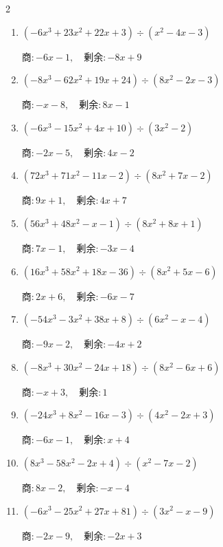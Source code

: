 \begin{multicols}{2}
\begin{enumerate}
        $商 : -9x-1, \quad 剰余 : 2x+4$

  \item $(-6x^{3}+23x^{2}+22x+3) \div (x^{2}-4x-3)$

        $商 : -6x-1, \quad 剰余 : -8x+9$

  \item $(-8x^{3}-62x^{2}+19x+24) \div (8x^{2}-2x-3)$

        $商 : -x-8, \quad 剰余 : 8x-1$

\columnbreak %

\resetques

  \item $(-6x^{3}-15x^{2}+4x+10) \div (3x^{2}-2)$

        $商 : -2x-5, \quad 剰余 : 4x-2$

  \item $(72x^{3}+71x^{2}-11x-2) \div (8x^{2}+7x-2)$

        $商 : 9x+1, \quad 剰余 : 4x+7$

  \item $(56x^{3}+48x^{2}-x-1) \div (8x^{2}+8x+1)$

        $商 : 7x-1, \quad 剰余 : -3x-4$

  \item $(16x^{3}+58x^{2}+18x-36) \div (8x^{2}+5x-6)$

        $商 : 2x+6, \quad 剰余 : -6x-7$

  \item $(-54x^{3}-3x^{2}+38x+8) \div (6x^{2}-x-4)$

        $商 : -9x-2, \quad 剰余 : -4x+2$

\columnbreak %

  \item $(-8x^{3}+30x^{2}-24x+18) \div (8x^{2}-6x+6)$

        $商 : -x+3, \quad 剰余 : 1$

  \item $(-24x^{3}+8x^{2}-16x-3) \div (4x^{2}-2x+3)$

        $商 : -6x-1, \quad 剰余 : x+4$

  \item $(8x^{3}-58x^{2}-2x+4) \div (x^{2}-7x-2)$

        $商 : 8x-2, \quad 剰余 : -x-4$

  \item $(-6x^{3}-25x^{2}+27x+81) \div (3x^{2}-x-9)$

        $商 : -2x-9, \quad 剰余 : -2x+3$


\end{enumerate}
\end{multicols}
